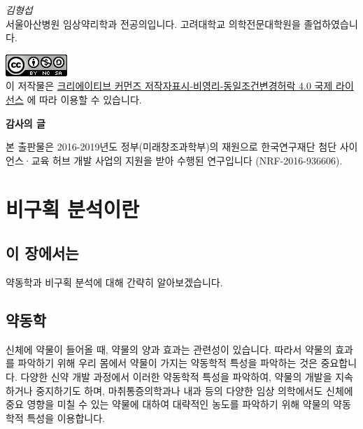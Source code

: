 \documentclass[12pt,]{krantz}
\let\BeginKnitrBlock\begin \let\EndKnitrBlock\end
\begin{document}
\emph{김형섭}\\
서울아산병원 임상약리학과 전공의입니다. 고려대학교 의학전문대학원을 졸업하였습니다.

\includegraphics{assets/cc.png}\\
이 저작물은 \href{http://creativecommons.org/licenses/by-nc-sa/4.0/}{크리에이티브 커먼즈 저작자표시-비영리-동일조건변경허락 4.0 국제 라이선스} 에 따라 이용할 수 있습니다.

\textbf{감사의 글}

\BeginKnitrBlock{rmdnote}
본 출판물은 2016-2019년도 정부(미래창조과학부)의 재원으로 한국연구재단 첨단 사이언스·교육 허브 개발 사업의 지원을 받아 수행된 연구입니다 (NRF-2016-936606).
\EndKnitrBlock{rmdnote}

\mainmatter

\hypertarget{introduction}{%
\chapter{비구획 분석이란}\label{introduction}}

\hypertarget{summary-introduction}{%
\section{이 장에서는}\label{summary-introduction}}

약동학과 비구획 분석에 대해 간략히 알아보겠습니다.

\hypertarget{PK-introduction}{%
\section{약동학}\label{PK-introduction}}

신체에 약물이 들어올 때, 약물의 양과 효과는 관련성이 있습니다.
따라서 약물의 효과를 파악하기 위해 우리 몸에서 약물이 가지는 약동학적 특성을 파악하는 것은 중요합니다.
다양한 신약 개발 과정에서 이러한 약동학적 특성을 파악하여, 약물의 개발을 지속하거나 중지하기도 하며, 마취통증의학과나 내과 등의 다양한 임상 의학에서도 신체에 중요 영향을 미칠 수 있는 약물에 대하여 대략적인 농도를 파악하기 위해 약물의 약동학적 특성을 이용합니다.
\end{document}
